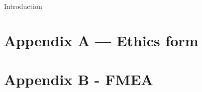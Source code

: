 \documentclass[oneside]{article}
\begin{document}

	\tableofcontents
	\clearpage
	\listoffigures
	\clearpage
{}

		{Introduction}
	\clearpage

		\section{Appendix A --- Ethics form} \label{sec:appendix-ethics}
		
		\section[]{Appendix B - FMEA} \label{sec:appendix-FMEA}
		
	
	
\end{document}
